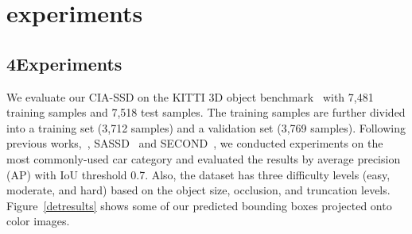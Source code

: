 \documentclass[letterpaper]{article}
\begin{document}
\else
\chapter{experiments}
\fi




\section{4\quad Experiments}

We evaluate our CIA-SSD on the KITTI 3D object benchmark~\cite{geiger2013vision} with 7,481 training samples and 7,518 test samples.
The training samples are further divided into a training set (3,712 samples) and a validation set (3,769 samples).
Following previous works,~\eg, SASSD~\cite{he2020structure} and SECOND~\cite{yan2018second}, we conducted experiments on the most commonly-used car category and evaluated the results by average precision (AP) with IoU threshold 0.7.
Also, the dataset has three difficulty levels (easy, moderate, and hard) based on the object size, occlusion, and truncation levels.
Figure~\ref{detresults} shows some of our predicted bounding boxes projected onto color images.
\end{document}
